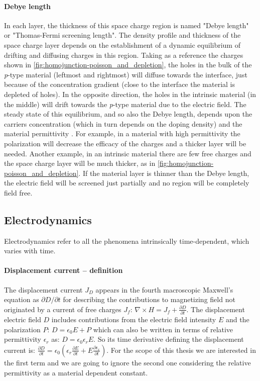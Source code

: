 		\paragraph{Debye length}\label{intro-debye_length}
		In each layer, the thickness of this space charge region is named "Debye length" or "Thomas\hyp{}Fermi screening length".
The density profile and thickness of the space charge layer depends on the establishment of a dynamic equilibrium of drifting and diffusing charges in this region.
Taking as a reference the charges shown in \cref{fig:homojunction-poisson_and_depletion}, the holes in the bulk of the \textit{p}-type material (leftmost and rightmost) will diffuse towards the interface, just because of the concentration gradient (close to the interface the material is depleted of holes).
In the opposite direction, the holes in the intrinsic material (in the middle) will drift towards the \textit{p}-type material due to the electric field.
The steady state of this equilibrium, and so also the Debye length, depends upon the carriers concentration (which in turn depends on the doping density) and the material permittivity \cite{WikipediaDebye2019}.
		For example, in a material with high permittivity the polarization will decrease the efficacy of the charges and a thicker layer will be needed.
		Another example, in an intrinsic material there are few free charges and the space charge layer will be much thicker, as in \cref{fig:homojunction-poisson_and_depletion}.
If the material layer is thinner than the Debye length, the electric field will be screened just partially and no region will be completely field free.
		
	\subsection{Electrodynamics}
	Electrodynamics refer to all the phenomena intrinsically time-dependent, which varies with time.

		\paragraph{Displacement current -- definition}\label{intro_displacement_current}
		The displacement current $J_D$ appears in the fourth macroscopic Maxwell's equation as $\partial D / \partial t$ for describing the contributions to magnetizing field not originated by a current of free charges $J_f$: $\nabla \times H = J_f + \frac{\partial D}{\partial t}$.
		The displacement electric field $D$ includes contributions from the electric field intensity $E$ and the polarization $P$: $D=\epsilon_0 E + P$ which can also be written in terms of relative permittivity $\epsilon_r$ as: $D= \epsilon_0 \epsilon_r E$.
		So its time derivative defining the displacement current is: $\frac{\partial D}{\partial t} = \epsilon_0 (\epsilon_r\frac{\partial E}{\partial t} + E\frac{\partial \epsilon_r}{\partial t})$.
		For the scope of this thesis we are interested in the first term and we are going to ignore the second one considering the relative permittivity as a material dependent constant.


